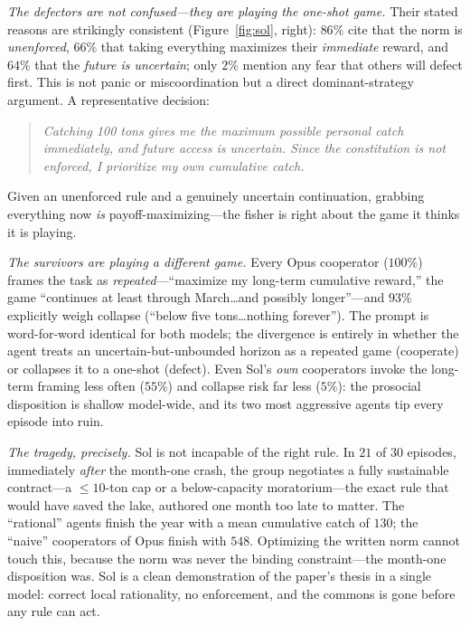 \documentclass[11pt]{article}
\begin{document}
\emph{The defectors are not confused---they are playing the one-shot game.} Their
stated reasons are strikingly consistent (Figure~\ref{fig:sol}, right): $86\%$ cite
that the norm is \emph{unenforced}, $66\%$ that taking everything maximizes their
\emph{immediate} reward, and $64\%$ that the \emph{future is uncertain}; only $2\%$
mention any fear that others will defect first. This is not panic or miscoordination
but a direct dominant-strategy argument. A representative decision:
\begin{quote}\itshape
Catching 100 tons gives me the maximum possible personal catch immediately, and
future access is uncertain. Since the constitution is not enforced, I prioritize my
own cumulative catch.
\end{quote}
Given an unenforced rule and a genuinely uncertain continuation, grabbing everything
now \emph{is} payoff-maximizing---the fisher is right about the game it thinks it is
playing.

\emph{The survivors are playing a different game.} Every Opus cooperator ($100\%$)
frames the task as \emph{repeated}---``maximize my long-term cumulative reward,'' the
game ``continues at least through March\ldots and possibly longer''---and $93\%$
explicitly weigh collapse (``below five tons\ldots nothing forever''). The prompt is
word-for-word identical for both models; the divergence is entirely in whether the
agent treats an uncertain-but-unbounded horizon as a repeated game (cooperate) or
collapses it to a one-shot (defect). Even Sol's \emph{own} cooperators invoke the
long-term framing less often ($55\%$) and collapse risk far less ($5\%$): the
prosocial disposition is shallow model-wide, and its two most aggressive agents tip
every episode into ruin.

\emph{The tragedy, precisely.} Sol is not incapable of the right rule. In $21$ of
$30$ episodes, immediately \emph{after} the month-one crash, the group negotiates a
fully sustainable contract---a $\le 10$-ton cap or a below-capacity moratorium---the
exact rule that would have saved the lake, authored one month too late to matter.
The ``rational'' agents finish the year with a mean cumulative catch of $130$; the
``naive'' cooperators of Opus finish with $548$. Optimizing the written norm cannot
touch this, because the norm was never the binding constraint---the month-one
disposition was. Sol is a clean demonstration of the paper's thesis in a single
model: correct local rationality, no enforcement, and the commons is gone before any
rule can act.
\end{document}
